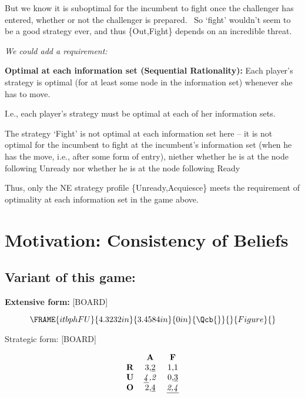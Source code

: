 \documentclass{article}
\begin{document}
\bigskip

But we know it is suboptimal for the incumbent to fight once the challenger
has entered, whether or not the challenger is prepared. \ So `fight'
wouldn't seem to be a good strategy ever, and thus \{Out,Fight\} depends on
an incredible threat.

\bigskip

\textit{We could add a requirement:}

\textbf{Optimal at each information set (\textbf{Sequential Rationality}):}
Each player's strategy is optimal (for at least some node in the information
set) whenever she has to move.

I.e., each player's strategy must be optimal at each of her information sets.

\bigskip

The strategy `Fight' is not optimal at each information set here -- it is
not optimal for the incumbent to fight at the incumbent's information set
(when he has the move, i.e., after some form of entry), niether whether he
is at the node following Unready nor whether he is at the node following
Ready

\bigskip

Thus, only the NE strategy profile \{Unready,Acquiesce\} meets the
requirement of optimality at each information set in the game above.

\bigskip

\section{Motivation: Consistency of Beliefs}

\subsection{Variant of this game:}

\textbf{Extensive form: }[BOARD]

\[
\FRAME{itbphFU}{4.3232in}{3.4584in}{0in}{\Qcb{{}}}{}{Figure}{\special%
{language "Scientific Word";type "GRAPHIC";maintain-aspect-ratio
TRUE;display "USEDEF";valid_file "T";width 4.3232in;height 3.4584in;depth
0in;original-width 5.4803in;original-height 3.4396in;cropleft "0";croptop
"1";cropright "1";cropbottom "0";tempfilename
'JSY1RZ0A.wmf';tempfile-properties "XPR";}} 
\]

Strategic form: [BOARD]

\[
\begin{tabular}{ccc}
& \textbf{A} & \textbf{F} \\ 
\textbf{R} & 3,\underline{2} & 1,1 \\ 
\textbf{U} & \underline{\textit{4}}\textit{,2} & 0,\underline{3} \\ 
\textbf{O} & 2,\underline{4} & \underline{\textit{2,4}}%
\end{tabular}%
\]
\end{document}
